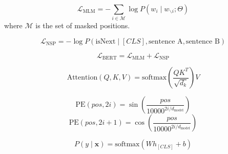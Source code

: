 
\begin{equation}
\mathcal{L}_{\text{MLM}} = -\sum_{i \in \mathcal{M}} \log P(w_i \mid w_{\backslash i}; \Theta)
\end{equation}
where \(\mathcal{M}\) is the set of masked positions.

\begin{equation}
\mathcal{L}_{\text{NSP}} = -\log P(\text{isNext} \mid [CLS], \text{sentence A}, \text{sentence B})
\end{equation}

\begin{equation}
\mathcal{L}_{\text{BERT}} = \mathcal{L}_{\text{MLM}} + \mathcal{L}_{\text{NSP}}
\end{equation}

\begin{equation}
\text{Attention}(Q, K, V) = \text{softmax}\left( \frac{QK^T}{\sqrt{d_k}} \right) V
\end{equation}

\begin{equation}
\text{PE}(pos, 2i) = \sin\left( \frac{pos}{10000^{2i/d_{\text{model}}}} \right)
\end{equation}
\begin{equation}
\text{PE}(pos, 2i+1) = \cos\left( \frac{pos}{10000^{2i/d_{\text{model}}}} \right)
\end{equation}

\begin{equation}
P(y \mid \mathbf{x}) = \text{softmax}(W h_{[CLS]} + b)
\end{equation}